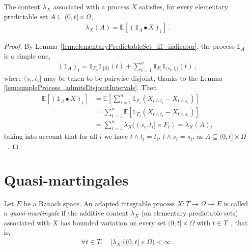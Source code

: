 \begin{lemma}\label{lem:contentEquivElementaryIntegral}
  The content $\lambda_X$ associated with a process $X$ satisfies,
  for every elementary predictable set $A\subseteq (0, t] \times \Omega$,
\begin{align*}
  \lambda_X(A) = \mathbb{E}[(\mathbb{1}_A \bullet X)_t]
  \: .
\end{align*}
\end{lemma}

\begin{proof}
  By Lemma~\ref{lem:elementaryPredictableSet_iff_indicator},
  the process $\mathbb{1}_A$ is a simple one,
\begin{align*}
  (\mathbb{1}_A)_t
  =
  \mathbb{1}_{F_0}\mathbb{1}_{\{0\}}(t) + \sum_{i=1}^n \mathbb{1}_{F_i} \mathbb{1}_{(s_i, t_i]}(t)
  \:,
\end{align*}
  where $(s_i, t_i]$ may be taken to be pairwise disjoint,
  thanks to the Lemma \ref{lem:simpleProcess_admitsDisjointIntervals}.
Then %
\begin{align*}
  \mathbb{E}[(\mathbb{1}_A \bullet X)_t]
  &= \mathbb{E}\left[\sum_{i=1}^n \mathbb{1}_{F_i} (X_{t \wedge t_i} - X_{t \wedge s_i})\right]
  \\
  &= \sum_{i=1}^n \mathbb{E}\left[\mathbb{1}_{F_i} (X_{t \wedge t_i} - X_{t \wedge s_i})\right]
  \\
  &= \sum_{i=1}^n \lambda_X((s_i, t_i] \times F_i)
  = \lambda_X(A),
\end{align*}
taking into account that for all $i$ we have
$t\wedge t_i = t_i$, $t\wedge s_i = s_i$,
as $A\subseteq (0, t] \times \Omega$~.
\end{proof}


\section{Quasi-martingales}

\begin{definition}\label{def:Quasimartingale}
Let $E$ be a Banach space.
An adapted integrable process $X : T \to \Omega \to E$ is called a
\emph{quasi-martingale} if the additive content $\lambda_X$ (on elementary predictable sets)
associated with $X$ has bounded variation on every set $(0, t] \times \Omega$ with $t \in T$~, that is,
\begin{align*}
  \forall t \in T, \quad \vert \lambda_X \vert\big((0, t] \times \Omega\big) < \infty
  \: .
\end{align*}
\end{definition}


